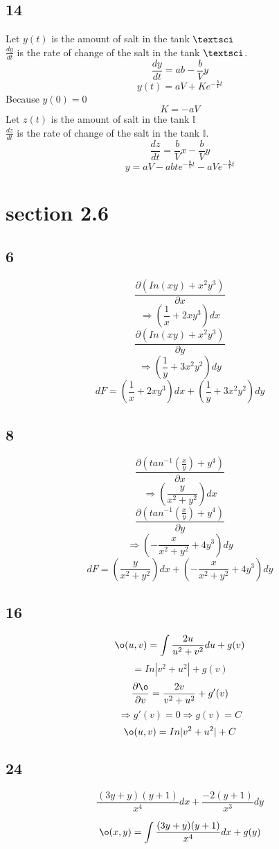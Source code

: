 \documentclass[12pt, a4paper]{IEEEtran}
\begin{document}
\subsection*{14}
Let $y(t)$ is the amount of salt in the tank $\textsci$ \\
$\frac{dy}{dt}$ is the rate of change of the salt in the tank $\textsci$.
$$\frac{dy}{dt}=ab-\frac{b}{V}y$$
$$y(t)=aV+Ke^{-\frac{b}{V}t}$$
Because $y(0)=0$
$$K=-aV$$
Let $z(t)$ is the amount of salt in the tank $\mathds{I}$ \\
$\frac{dz}{dt}$ is the rate of change of the salt in the tank $\mathds{I}$.
$$\frac{dz}{dt}=\frac{b}{V}x-\frac{b}{V}y$$
$$y=aV-abte^{-\frac{b}{V}t}-aVe^{-\frac{b}{V}t}$$




\section*{section 2.6}
\subsection*{6}
$$\frac{\partial (In(xy)+x^2 y^3)}{\partial x}$$
$$\Rightarrow (\frac{1}{x}+2xy^3)dx$$
$$\frac{\partial (In(xy)+x^2 y^3)}{\partial y}$$
$$\Rightarrow (\frac{1}{y}+3x^2y^2)dy$$
$$dF=(\frac{1}{x}+2xy^3)dx+(\frac{1}{y}+3x^2y^2)dy$$
\subsection*{8}
$$\frac{\partial (tan^{-1}(\frac{x}{y})+y^4)}{\partial x}$$
$$\Rightarrow (\frac{y}{x^2+y^2})dx$$
$$\frac{\partial (tan^{-1}(\frac{x}{y})+y^4)}{\partial y}$$
$$\Rightarrow (-\frac{x}{x^2+y^2}+4y^3)dy$$
$$dF=(\frac{y}{x^2+y^2})dx+(-\frac{x}{x^2+y^2}+4y^3)dy$$

\subsection*{16}
$$\o(u,v)=\int \frac{2u}{u^2+v^2}du + g(v)$$
$$=In|v^2+u^2|+g(v)$$
$$\frac{\partial \o}{\partial v}=\frac{2v}{v^2+u^2}+g'(v)$$
$$\Rightarrow g'(v)=0 \Rightarrow g(v)=C$$
$$\o (u,v)=In|v^2+u^2|+C$$

\subsection*{24}
$$\frac{(3y+y)(y+1)}{x^4}dx+\frac{-2(y+1)}{x^3}dy$$

$$\o(x,y)=\int \frac{(3y+y)(y+1)}{x^4}dx +g(y)$$
\end{document}
